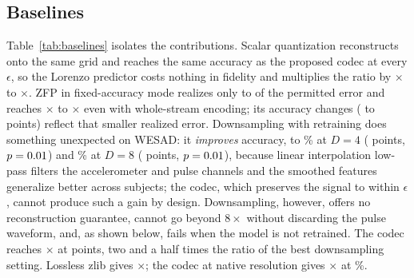 \documentclass[journal]{IEEEtran}
\begin{document}
\subsection{Baselines}
Table~\ref{tab:baselines} isolates the contributions. Scalar quantization reconstructs onto the same grid and reaches the same accuracy as the proposed codec at every $\epsilon$, so the Lorenzo predictor costs nothing in fidelity and multiplies the ratio by \predGainMin$\times$ to \predGainMax$\times$. ZFP in fixed-accuracy mode realizes only \zfpErrMin{} to \zfpErrMax{} of the permitted error and reaches \zfpRatioMin$\times$ to \zfpRatioMax$\times$ even with whole-stream encoding; its accuracy changes (\zfpDAccMin{} to \zfpDAccMax{} points) reflect that smaller realized error. Downsampling with retraining does something unexpected on WESAD: it \emph{improves} accuracy, to \dsAccC\% at $D=4$ (\dsDAccC{} points, $p=0.01$) and \dsAccE\% at $D=8$ (\dsDAccE{} points, $p=0.01$), because linear interpolation low-pass filters the accelerometer and pulse channels and the smoothed features generalize better across subjects; the codec, which preserves the signal to within $\epsilon$, cannot produce such a gain by design. Downsampling, however, offers no reconstruction guarantee, cannot go beyond $8\times$ without discarding the pulse waveform, and, as shown below, fails when the model is not retrained. The codec reaches \ratioEe$\times$ at \dAccEe{} points, two and a half times the ratio of the best downsampling setting. Lossless zlib gives \ratioLossless$\times$; the codec at native resolution gives \ratioNative$\times$ at \accNative\%.
\end{document}
